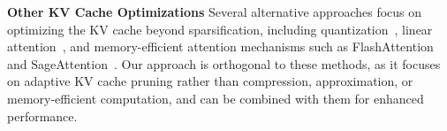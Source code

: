 




\textbf{Other KV Cache Optimizations} Several alternative approaches focus on optimizing the KV cache beyond sparsification, including quantization~\cite{hooper2024kvquant10millioncontext, kivi,kang2024gearefficientkvcache,nawrot2024dynamicmemorycompressionretrofitting}, linear attention~\cite{wang2020linformerselfattentionlinearcomplexity, katharopoulos2020transformersrnnsfastautoregressive}, and memory-efficient attention mechanisms such as FlashAttention~\cite{dao2023flashattention2} and SageAttention~\cite{zhang2025sageattention,zhang2024sageattention2}.
Our approach is orthogonal to these methods, as it focuses on adaptive KV cache pruning rather than compression, approximation, or memory-efficient computation, and can be combined with them for enhanced performance.